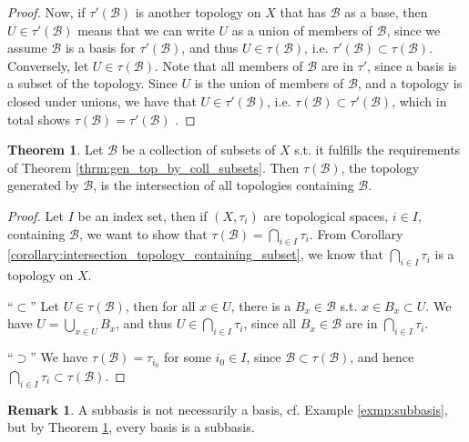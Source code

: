 \documentclass[12pt, a4paper]{article}
\numberwithin{equation}{section}
\theoremstyle{definition}
\theoremstyle{definition}
\newtheorem{remark}[thm]{Remark} %
\newtheorem{theorem}[thm]{Theorem}
\begin{document}
\begin{proof}
			Now, if $\tau'(\mathscr B)$ is another topology on $X$ that has $\mathscr B$ as a base, then $U\in\tau'(\mathscr B)$ means that we can write $U$ as a union of members of $\mathscr B$, since we assume $\mathscr B$ is a basis for $\tau'(\mathscr B)$, and thus $U\in \tau(\mathscr B)$, i.e. $\tau'(\mathscr B)\subset \tau(\mathscr B)$. Conversely, let $U\in\tau(\mathscr B)$. Note that all members of $\mathscr B$ are in $\tau'$, since a basis is a subset of the topology. Since $U$ is the union of members of $\mathscr B$, and a topology is closed under unions, we have that $U\in\tau'(\mathscr B)$, i.e. $\tau(\mathscr B)\subset\tau'(\mathscr B)$, which in total shows $\tau(\mathscr B) = \tau'(\mathscr B)$ \cite{713096}.
		\end{proof}
	
		\begin{theorem}\label{thrm:topology_generated_by_basis_intersection_topology}
			Let $\mathscr B$ be a collection of subsets of $X$ s.t. it fulfills the requirements of Theorem \ref{thrm:gen_top_by_coll_subsets}. Then $\tau(\mathscr B)$, the topology generated by $\mathscr B$, is the intersection of all topologies containing $\mathscr B$.
		\end{theorem}
	
		\begin{proof}
			Let $I$ be an index set, then if $(X, \tau_i)$ are topological spaces, $i\in I$, containing $\mathscr B$, we want to show that $\tau(\mathscr B) = \bigcap_{i\in I}\tau_i$. From Corollary \ref{corollary:intersection_topology_containing_subset}, we know that $\bigcap_{i\in I}\tau_i$ is a topology on $X$.
				
			\enquote{$\subset$} Let $U\in\tau(\mathscr B)$, then for all $x\in U$, there is a $B_x\in\mathscr B$ s.t. $x\in B_x\subset U$. We have $U = \bigcup_{x\in U}B_x$, and thus $U\in \bigcap_{i\in I}\tau_i$, since all $B_x\in \mathscr B$ are in $\bigcap_{i\in I}\tau_i$. 
			
			\enquote{$\supset$} We have $\tau(\mathscr B) = \tau_{i_0}$ for some $i_0\in I$, since $\mathscr B\subset \tau(\mathscr B)$, and hence $\bigcap_{i\in I}\tau_i\subset \tau(\mathscr B)$.
		\end{proof}
	
		\begin{remark}
			A subbasis is not necessarily a basis, cf. Example \ref{exmp:subbasis}, but by Theorem  \ref{thrm:topology_generated_by_basis_intersection_topology}, every basis is a subbasis.
		\end{remark}
	
\end{document}
